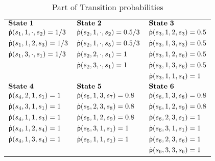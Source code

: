 \documentclass[10pt, conference, compsocconf]{IEEEtran}
\begin{document}
\begin{table}[h]
\centering
\scriptsize
\caption{\label{statetransition} Part of Transition probabilities}
\begin{tabular}{lll}\hline
$\begin{bf}State~1\end{bf}$         &$\begin{bf}State~2\end{bf}$        &$\begin{bf}State~3\end{bf}$\\
${\sf \dot{p}}(s_1,1,\cdot,s_2)=1/3$                        &${\sf \dot{p}}(s_2,1,\cdot,s_2)=0.5/3$                         &${\sf \dot{p}}(s_3,1,2, s_3)=0.5$\\
${\sf \dot{p}}(s_1,1,2, s_3)=1/3$                          &${\sf \dot{p}}(s_2,1,\cdot, s_5)=0.5/3$                         &${\sf \dot{p}}(s_3,1,3, s_3)=0.5$\\
${\sf \dot{p}}(s_1,3,\cdot, s_1)=1/3$                      &${\sf \dot{p}}(s_2,2,\cdot, s_1)=1$                             &${\sf \dot{p}}(s_3,1,2, s_6)=0.5$\\
$ $                &${\sf \dot{p}}(s_2,3,\cdot, s_1)=1$             &${\sf \dot{p}}(s_3,1,3, s_6)=0.5$\\
$ $                &$ $             &${\sf \dot{p}}(s_3,1,1, s_4)=1$\\
$\begin{bf}State~4\end{bf}$         &$\begin{bf}State~5\end{bf}$        &$\begin{bf}State~6\end{bf}$\\
${\sf \dot{p}}(s_4,2,1, s_1)=1$                &${\sf \dot{p}}(s_5,1,3,s_7)=0.8$             &${\sf \dot{p}}(s_6,1,3, s_8)=0.8$\\
${\sf \dot{p}}(s_4,3,1, s_1)=1$                &${\sf \dot{p}}(s_5,2,3, s_8)=0.8$             &${\sf \dot{p}}(s_6,1,2, s_9)=0.8$\\
${\sf \dot{p}}(s_4,1,1, s_3)=1$                &${\sf \dot{p}}(s_5,1,2, s_9)=0.8$             &${\sf \dot{p}}(s_6,2,3 ,s_1)=1$\\
${\sf \dot{p}}(s_4,1,2, s_4)=1$                &${\sf \dot{p}}(s_5,3,1, s_1)=1$             &${\sf \dot{p}}(s_6,3,1, s_1)=1$\\
${\sf \dot{p}}(s_4,1,3, s_4)=1$                &${\sf \dot{p}}(s_5,1,1, s_1)=1$             &${\sf \dot{p}}(s_6,2,3 ,s_6)=1$\\
$ $                &$ $             &${\sf \dot{p}}(s_6,3,3, s_6)=1$\\
\hline
\end{tabular}
\end{table}
\end{document}
